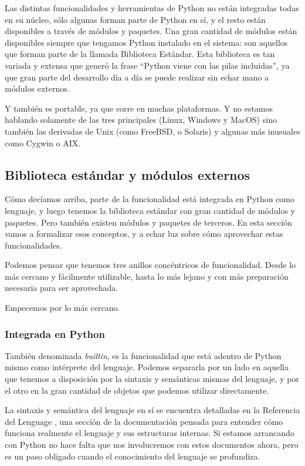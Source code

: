 Las distintas funcionalidades y herramientas de Python no están integradas todas en su núcleo, sólo algunas forman parte de Python en sí, y el resto están disponibles a través de módulos y paquetes. Una gran cantidad de módulos están disponibles siempre que tengamos Python instalado en el sistema: son aquellos que forman parte de la llamada Biblioteca Estándar. Esta biblioteca es tan variada y extensa que generó la frase ``Python viene con las pilas incluidas'', ya que gran parte del desarrollo día a día se puede realizar sin echar mano a módulos externos.

Y también es portable, ya que corre en muchas plataformas. Y no estamos hablando solamente de las tres principales (Linux, Windows y MacOS) sino también las derivadas de Unix (como FreeBSD, o Solaris) y algunas más inusuales como Cygwin o AIX.


\subsection{Biblioteca estándar y módulos externos}\label{intro--stdlib-y-modulos}

Cómo decíamos arriba, parte de la funcionalidad está integrada en Python como lenguaje, y luego tenemos la biblioteca estándar con gran cantidad de módulos y paquetes. Pero también existen módulos y paquetes de terceros. En esta sección vamos a formalizar esos conceptos, y a echar luz sobre cómo aprovechar estas funcionalidades.

Podemos pensar que tenemos tres anillos concéntricos de funcionalidad. Desde lo más cercano y fácilmente utilizable, hasta lo más lejano y con más preparación necesaria para ser aprovechada.

Empecemos por lo más cercano.

\subsubsection{Integrada en Python}\label{intro--modulos-builtin}

También denominada \textit{builtin}, es la funcionalidad que está adentro de Python mismo como intérprete del lenguaje. Podemos separarla por un lado en aquella que tenemos a disposición por la sintaxis y semánticas mismas del lenguaje, y por el otro en la gran cantidad de objetos que podemos utilizar directamente.

La sintaxis y semántica del lenguaje en sí se encuentra detalladas en la Referencia del Lenguage \cite{reflenguaje}, una sección de la documentación pensada para entender cómo funciona realmente el lenguaje y sus estructuras internas. Si estamos arrancando con Python no hace falta que nos involucremos con estos documentos ahora, pero es un paso obligado cuando el conocimiento del lenguaje se profundiza.

